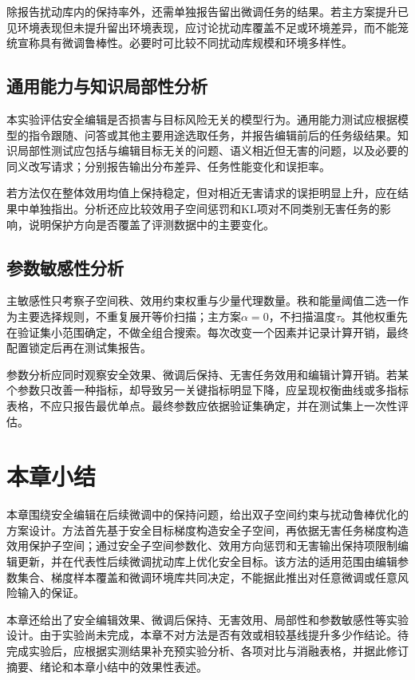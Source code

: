 除报告扰动库内的保持率外，还需单独报告留出微调任务的结果。若主方案提升已见环境表现但未提升留出环境表现，应讨论扰动库覆盖不足或环境差异，而不能笼统宣称具有微调鲁棒性。必要时可比较不同扰动库规模和环境多样性。


\subsection{通用能力与知识局部性分析}

本实验评估安全编辑是否损害与目标风险无关的模型行为。通用能力测试应根据模型的指令跟随、问答或其他主要用途选取任务，并报告编辑前后的任务级结果。知识局部性测试应包括与编辑目标无关的问题、语义相近但无害的问题，以及必要的同义改写请求；分别报告输出分布差异、任务性能变化和误拒率。

若方法仅在整体效用均值上保持稳定，但对相近无害请求的误拒明显上升，应在结果中单独指出。分析还应比较效用子空间惩罚和KL项对不同类别无害任务的影响，说明保护方向是否覆盖了评测数据中的主要变化。


\subsection{参数敏感性分析}

主敏感性只考察子空间秩、效用约束权重与少量代理数量。秩和能量阈值二选一作为主要选择规则，不重复展开等价扫描；主方案$\alpha=0$，不扫描温度$\tau$。其他权重先在验证集小范围确定，不做全组合搜索。每次改变一个因素并记录计算开销，最终配置锁定后再在测试集报告。

参数分析应同时观察安全效果、微调后保持、无害任务效用和编辑计算开销。若某个参数只改善一种指标，却导致另一关键指标明显下降，应呈现权衡曲线或多指标表格，不应只报告最优单点。最终参数应依据验证集确定，并在测试集上一次性评估。


\section{本章小结}

本章围绕安全编辑在后续微调中的保持问题，给出双子空间约束与扰动鲁棒优化的方案设计。方法首先基于安全目标梯度构造安全子空间，再依据无害任务梯度构造效用保护子空间；通过安全子空间参数化、效用方向惩罚和无害输出保持项限制编辑更新，并在代表性后续微调扰动库上优化安全目标。该方法的适用范围由编辑参数集合、梯度样本覆盖和微调环境库共同决定，不能据此推出对任意微调或任意风险输入的保证。

本章还给出了安全编辑效果、微调后保持、无害效用、局部性和参数敏感性等实验设计。由于实验尚未完成，本章不对方法是否有效或相较基线提升多少作结论。待完成实验后，应根据实测结果补充预实验分析、各项对比与消融表格，并据此修订摘要、绪论和本章小结中的效果性表述。
